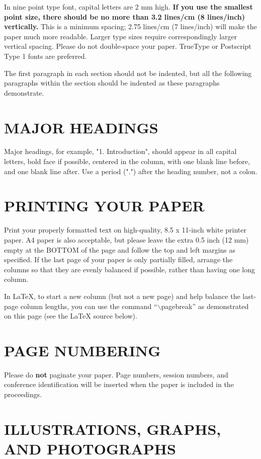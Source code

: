 \documentclass[letterpaper, 11 pt, twoside, conference]{ieeeconf}
\begin{document}
In nine point type font, capital letters are 2 mm high.  {\bf If you use the
smallest point size, there should be no more than 3.2 lines/cm (8 lines/inch)
vertically.}  This is a minimum spacing; 2.75 lines/cm (7 lines/inch) will make
the paper much more readable.  Larger type sizes require correspondingly larger
vertical spacing.  Please do not double-space your paper.  TrueType or
Postscript Type 1 fonts are preferred.

The first paragraph in each section should not be indented, but all the
following paragraphs within the section should be indented as these paragraphs
demonstrate.

\section{MAJOR HEADINGS}
\label{sec:majhead}

Major headings, for example, "1. Introduction", should appear in all capital
letters, bold face if possible, centered in the column, with one blank line
before, and one blank line after. Use a period (".") after the heading number,
not a colon.

\section{PRINTING YOUR PAPER}
\label{sec:print}

Print your properly formatted text on high-quality, 8.5 x 11-inch white printer
paper. A4 paper is also acceptable, but please leave the extra 0.5 inch (12 mm)
empty at the BOTTOM of the page and follow the top and left margins as
specified.  If the last page of your paper is only partially filled, arrange
the columns so that they are evenly balanced if possible, rather than having
one long column.

In LaTeX, to start a new column (but not a new page) and help balance the
last-page column lengths, you can use the command ``$\backslash$pagebreak'' as
demonstrated on this page (see the LaTeX source below).

\section{PAGE NUMBERING}
\label{sec:page}

Please do {\bf not} paginate your paper.  Page numbers, session numbers, and
conference identification will be inserted when the paper is included in the
proceedings.

\section{ILLUSTRATIONS, GRAPHS, AND PHOTOGRAPHS}
\label{sec:illust}
\end{document}
